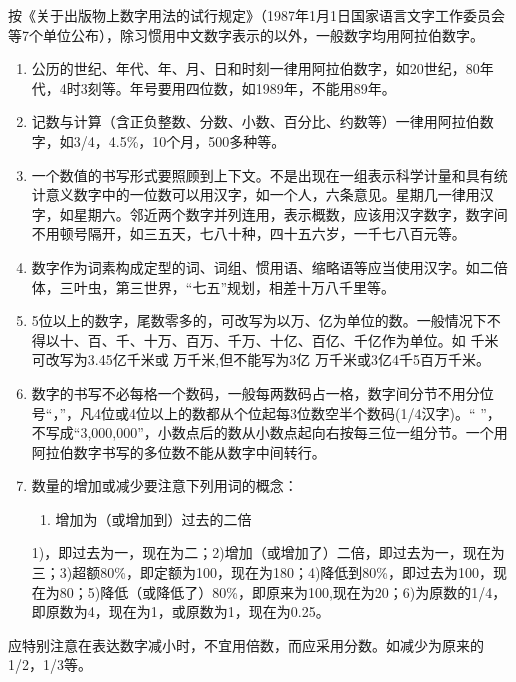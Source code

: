 
按《关于出版物上数字用法的试行规定》（1987年1月1日国家语言文字工作委员会等7个单位公布），除习惯用中文数字表示的以外，一般数字均用阿拉伯数字。
\begin{enumerate}[label=(\arabic*), left=2\ccwd..\parindent]
	\item 公历的世纪、年代、年、月、日和时刻一律用阿拉伯数字，如20世纪，80年代，4时3刻等。年号要用四位数，如1989年，不能用89年。
	\item 记数与计算（含正负整数、分数、小数、百分比、约数等）一律用阿拉伯数字，如3/4，4.5\%，10个月，500多种等。
	\item 一个数值的书写形式要照顾到上下文。不是出现在一组表示科学计量和具有统计意义数字中的一位数可以用汉字，如一个人，六条意见。星期几一律用汉字，如星期六。邻近两个数字并列连用，表示概数，应该用汉字数字，数字间不用顿号隔开，如三五天，七八十种，四十五六岁，一千七八百元等。
	\item 数字作为词素构成定型的词、词组、惯用语、缩略语等应当使用汉字。如二倍体，三叶虫，第三世界，“七五”规划，相差十万八千里等。
	\item 5位以上的数字，尾数零多的，可改写为以万、亿为单位的数。一般情况下不得以十、百、千、十万、百万、千万、十亿、百亿、千亿作为单位。如 千米可改写为3.45亿千米或 万千米,但不能写为3亿 万千米或3亿4千5百万千米。
	\item 数字的书写不必每格一个数码，一般每两数码占一格，数字间分节不用分位号“，”，凡4位或4位以上的数都从个位起每3位数空半个数码(1/4汉字)。“ ”，不写成“3,000,000”，小数点后的数从小数点起向右按每三位一组分节。一个用阿拉伯数字书写的多位数不能从数字中间转行。
	\item 数量的增加或减少要注意下列用词的概念：
	\begin{enumerate}[1)]
		\item 增加为（或增加到）过去的二倍
	\end{enumerate}
	1)，即过去为一，现在为二；2)增加（或增加了）二倍，即过去为一，现在为三；3)超额80\%，即定额为100，现在为180；4)降低到80\%，即过去为100，现在为80；5)降低（或降低了）80\%，即原来为100,现在为20；6)为原数的1/4，即原数为4，现在为1，或原数为1，现在为0.25。
\end{enumerate}


应特别注意在表达数字减小时，不宜用倍数，而应采用分数。如减少为原来的1/2，1/3等。
